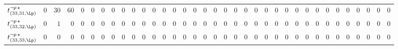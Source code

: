 \begin{tabular}{r|rrrrrrrrrrrrrrrrrrrrrrrrrrrrrrrrrr}
  $t^{\neg p \, \star}_{(33,31,\Lp)}$ & $0$ & $30$ & $60$ & $0$ & $0$ & $0$ & $0$ & $0$ & $0$ & $0$ & $0$ & $0$ & $0$ & $0$ & $0$ & $0$ & $0$ & $0$ & $0$ & $0$ & $0$ & $0$ & $0$ & $0$ & $0$ & $0$ & $0$ & $0$ & $0$ & $0$ & $0$ & $0$ & $0$ & $0$ \\
  $t^{\neg p \, \star}_{(33,32,\Lp)}$ & $0$ & $1$ & $0$ & $0$ & $0$ & $0$ & $0$ & $0$ & $0$ & $0$ & $0$ & $0$ & $0$ & $0$ & $0$ & $0$ & $0$ & $0$ & $0$ & $0$ & $0$ & $0$ & $0$ & $0$ & $0$ & $0$ & $0$ & $0$ & $0$ & $0$ & $0$ & $0$ & $0$ & $0$ \\
  $t^{\neg p \, \star}_{(33,33,\Lp)}$ & $0$ & $0$ & $0$ & $0$ & $0$ & $0$ & $0$ & $0$ & $0$ & $0$ & $0$ & $0$ & $0$ & $0$ & $0$ & $0$ & $0$ & $0$ & $0$ & $0$ & $0$ & $0$ & $0$ & $0$ & $0$ & $0$ & $0$ & $0$ & $0$ & $0$ & $0$ & $0$ & $0$ & $0$ \\
\end{tabular}
